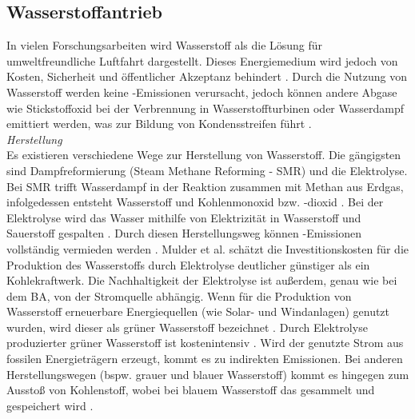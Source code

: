 \subsection{Wasserstoffantrieb}
\label{ss:Wasserstoff-Antrieb}

In vielen Forschungsarbeiten wird Wasserstoff als die Lösung für umweltfreundliche Luftfahrt dargestellt.
Dieses Energiemedium wird jedoch von Kosten, Sicherheit und öffentlicher Akzeptanz behindert \cite{ansell2023review}.
Durch die Nutzung von Wasserstoff werden keine -Emissionen verursacht, jedoch können andere Abgase 
wie Stickstoffoxid  bei der Verbrennung in Wasserstoffturbinen oder Wasserdampf emittiert werden, was zur Bildung von Kondensstreifen
führt \cite{hepperle2012electric}.\\

\textit{Herstellung}\\
Es existieren verschiedene Wege zur Herstellung von Wasserstoff. 
Die gängigsten sind Dampfreformierung (Steam Methane Reforming - SMR) und die Elektrolyse. %
Bei SMR trifft Wasserdampf in der Reaktion zusammen mit Methan aus Erdgas, infolgedessen entsteht 
Wasserstoff  und Kohlenmonoxid  bzw. -dioxid \cite{mulder2019outlook}. Bei der Elektrolyse wird das Wasser mithilfe von Elektrizität 
in Wasserstoff  und Sauerstoff  gespalten \cite{mulder2019outlook}. Durch diesen Herstellungsweg können -Emissionen 
vollständig vermieden werden \cite{dalmia2022powering}. 
Mulder et al. \cite{mulder2019outlook} schätzt die Investitionskosten für die Produktion des Wasserstoffs durch Elektrolyse deutlicher günstiger als ein Kohlekraftwerk.
Die Nachhaltigkeit der Elektrolyse ist außerdem, genau wie bei dem BA, von der Stromquelle abhängig.
%
Wenn für die Produktion von Wasserstoff erneuerbare Energiequellen (wie Solar- und Windanlagen) genutzt wurden, 
wird dieser als grüner Wasserstoff bezeichnet \cite{mulder2019outlook}. 
Durch Elektrolyse produzierter grüner Wasserstoff ist kostenintensiv \cite{dalmia2022powering}.
Wird der genutzte Strom aus fossilen Energieträgern erzeugt, kommt es zu indirekten Emissionen.
Bei anderen Herstellungswegen (bspw. grauer und blauer Wasserstoff) kommt es hingegen zum Ausstoß von Kohlenstoff, 
wobei bei blauem Wasserstoff das  gesammelt und gespeichert wird \cite{mulder2019outlook}.

